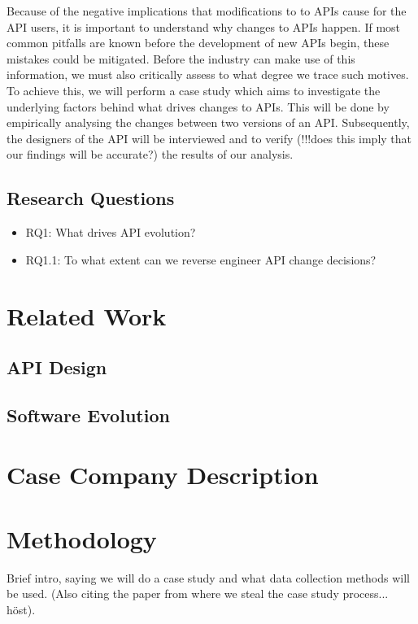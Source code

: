 \documentclass[10pt,twocolumn]{article}
\begin{document}
Because of the negative implications that modifications to to APIs cause for the API users, it is important to understand why changes to APIs happen. If most common pitfalls are known before the development of new APIs begin, these mistakes could be mitigated. Before the industry can make use of this information, we must also critically assess to what degree we trace such motives. To achieve this, we will perform a case study which aims to investigate the underlying factors behind what drives changes to APIs. This will be done by empirically analysing the changes between two versions of an API. Subsequently, the designers of the API will be interviewed and to verify (!!!does this imply that our findings will be accurate?) the results of our analysis. 

\subsection{Research Questions}
\begin{itemize}
\item RQ1: What drives API evolution? 
\item RQ1.1: To what extent can we reverse engineer API change decisions?
\end{itemize}


\section{Related Work}

\subsection{API Design}

\subsection{Software Evolution}



\section{Case Company Description}



\section{Methodology}
Brief intro, saying we will do a case study and what data collection methods will be used. (Also citing the paper from where we steal the case study process... höst).
\end{document}
